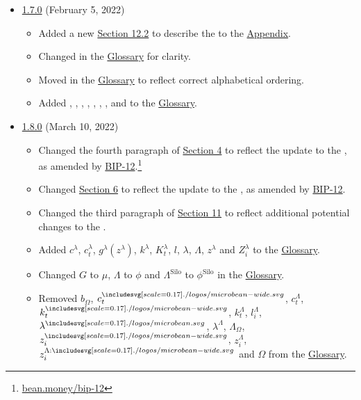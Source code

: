 \documentclass[class=article, crop=false]{standalone}
\begin{document}
\begin{itemize}[topsep=0pt, itemsep=3pt,leftmargin=16pt]
    \newpage
    
    \item \href{https://github.com/BeanstalkFarms/Beanstalk-Whitepaper/blob/master/version-history/beanstalk1_7_0.pdf}{1.7.0} (February 5, 2022)
    
    \begin{itemize}
        \item Added a new \hyperlink{subsection.12.2}{Section 12.2} to describe the  to the \hyperlink{section.14}{Appendix}.
        \item Changed  in the \hyperlink{subsection.14.11}{Glossary} for clarity. 
        \item Moved  in the \hyperlink{subsection.14.11}{Glossary} to reflect correct alphabetical ordering. 
        \item Added , , , , , , , and  to the \hyperlink{subsection.14.11}{Glossary}. 
    \end{itemize}
    
    \item \href{https://github.com/BeanstalkFarms/Beanstalk-Whitepaper/blob/master/version-history/beanstalk1_8_0.pdf}{1.8.0} (March 10, 2022)
        
    \begin{itemize}
        \item Changed the fourth paragraph of \hyperlink{section.4}{Section 4} to reflect the update to the , as amended by \href{https://bean.money/bip-12}{BIP-12}.\footnote{\href{https://bean.money/bip-12}{bean.money/bip-12}}
        \item Changed \hyperlink{section.6}{Section 6} to reflect the update to the , as amended by \href{https://bean.money/bip-12}{BIP-12}. 
        \item Changed the third paragraph of \hyperlink{section.11}{Section 11} to reflect additional potential changes to the . 
        \item Added  $c^{\lambda}$, $c_{t}^{\lambda}$, $g^{\lambda}(z^{\lambda})$, $k^{\lambda}$, $K_{t}^{\lambda}$, $l$, $\lambda$, $\Lambda$, $z^{\lambda}$ and $Z_i^{\lambda}$ to the \hyperlink{subsection.14.11}{Glossary}. 
        \item Changed $G$ to $\mu$, $\Lambda$ to $\phi$ and $\Lambda^{\text{Silo}}$ to $\phi^{\text{Silo}}$ in the \hyperlink{subsection.14.11}{Glossary}. 
        \item Removed $b_{\Omega}$, $c_{t}^{\bean}$, $c_{t}^{\Lambda}$, $k_{t}^{\bean}$, $k_{t}^{\Lambda}$, $l_{i}^{\Lambda}$, $\lambda^{\lambdabean}$, $\lambda^{\Lambda}$, ${\Lambda}_{\Omega}$, $z_{i}^{\bean}$, $z_{i}^{\Lambda}$, $z_{i}^{\Lambda:\bean}$ and $\Omega$ from the \hyperlink{subsection.14.11}{Glossary}.
    \end{itemize}
    

\end{itemize}
\end{document}
